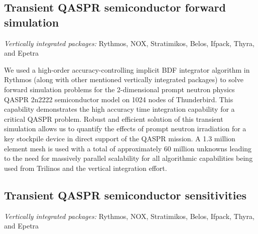 \documentclass[pdf,ps2pdf,11pt]{SANDreport}
\begin{document}

%
\subsection{Transient QASPR semiconductor forward simulation}
%

{}\noindent\textit{Vertically integrated packages:} Rythmos, NOX, Stratimikos,
Belos, Ifpack, Thyra, and Epetra

We used a high-order accuracy-controlling implicit BDF integrator algorithm in
Rythmos (along with other mentioned vertically integrated packages) to solve
forward simulation problems for the 2-dimensional prompt neutron physics
QASPR 2n2222 semiconductor model on 1024 nodes of Thunderbird.  This capability
demonstrates the high accuracy time integration capability for a critical
QASPR problem.  Robust and efficient solution of this transient simulation
allows us to quantify the effects of prompt neutron irradiation for a key
stockpile device in direct support of the QASPR mission.  A 1.3 million element
mesh is used with a total of approximately 60 million unknowns leading to
the need for massively parallel scalability for all algorithmic capabilities
being used from Trilinos and the vertical integration effort. 




%
\subsection{Transient QASPR semiconductor sensitivities}
%

{}\noindent\textit{Vertically integrated packages:} Rythmos, NOX, Stratimikos,
Belos, Ifpack, Thyra, and Epetra
\end{document}
